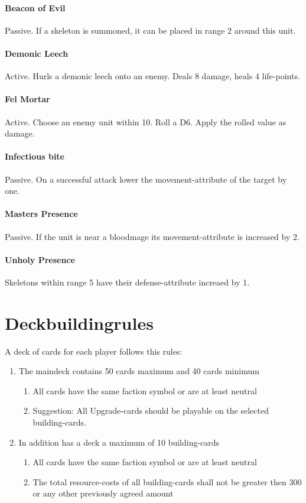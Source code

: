 \documentclass[a5paper,pagesize,10pt,bibtotoc,pointlessnumbers,
normalheadings,DIV=9,twoside=false]{scrbook}
\begin{document}
\subsubsection{Beacon of Evil}
Passive. If a skeleton is summoned, it can be placed in range 2 around this unit.

\subsubsection{Demonic Leech}
Active. Hurls a demonic leech onto an enemy. Deals 8 damage, heals 4 life-points.

\subsubsection{Fel Mortar}
Active. Choose an enemy unit within 10. Roll a D6. Apply the rolled value as damage.

\subsubsection{Infectious bite}
Passive. On a successful attack lower the movement-attribute of the target by one.

\subsubsection{Masters Presence}
Passive. If the unit is near a bloodmage its movement-attribute is increased by 2.

\subsubsection{Unholy Presence}
Skeletons within range 5 have their defense-attribute increaed by 1.



\chapter{Deckbuildingrules}

A deck of cards for each player follows this rules:

\begin{enumerate}
\item The maindeck contains 50 cards maximum and 40 cards minimum
\begin{enumerate}
\item All cards have the same faction symbol or are at least neutral
\item Suggestion: All Upgrade-cards should be playable on the selected building-cards.
\end{enumerate}
\item In addition has a deck a maximum of 10 building-cards
\begin{enumerate}
\item All cards have the same faction symbol or are at least neutral
\item The total resource-costs of all building-cards shall not be greater then 300 or any other previously agreed amount
\end{enumerate}
\end{enumerate}
\end{document}
